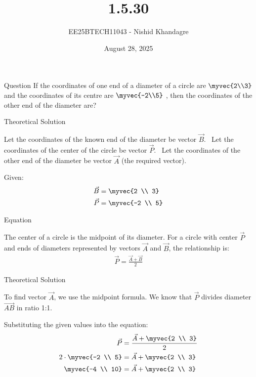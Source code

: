 \documentclass{beamer}
\title 
{1.5.30}
\date{August 28, 2025}
\author
{EE25BTECH11043 - Nishid Khandagre}
\begin{document}
\frame{\titlepage}
\begin{frame}{Question}
If the coordinates of one end of a diameter of a circle are $\myvec{2\\3}$ and the coordinates of its centre are $\myvec{-2\\5}$ , then the coordinates of the other end of the diameter are?
\end{frame}


\begin{frame}{Theoretical Solution}

Let the coordinates of the known end of the diameter be vector $\vec{B}$. \
Let the coordinates of the center of the circle be vector $\vec{P}$. \
Let the coordinates of the other end of the diameter be vector $\vec{A}$ (the required vector).

\end{frame}
\begin{frame}
Given:
\begin{align}
\vec{B} &= \myvec{2 \\ 3} \\
\vec{P} &= \myvec{-2 \\ 5}
\end{align}

\end{frame}

\begin{frame}{Equation}

The center of a circle is the midpoint of its diameter. For a circle with center $\vec{P}$ and ends of diameters represented by vectors $\vec{A}$ and $\vec{B}$, the relationship is:
\begin{align}
\vec{P}=\frac{\vec{A}+\vec{B}}{2}
\end{align}

\end{frame}

\begin{frame}{Theoretical Solution}

To find vector $\vec{A}$, we use the midpoint formula. We know that $\vec{P}$ divides diameter $\vec{AB}$ in ratio 1:1.

Substituting the given values into the equation:
\begin{align}
\vec{P} &= \frac{\vec{A} + \myvec{2 \\ 3}}{2} \\
2 \cdot \myvec{-2 \\ 5} &= \vec{A} + \myvec{2 \\ 3} \\
\myvec{-4 \\ 10} &= \vec{A} + \myvec{2 \\ 3}
\end{align}

\end{frame}
\end{document}
